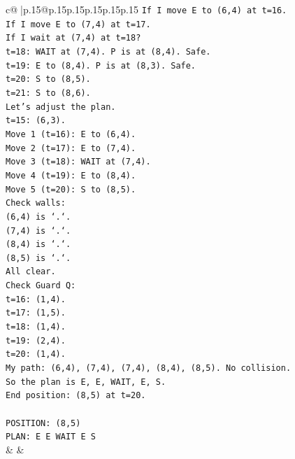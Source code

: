 \documentclass{article}
\begin{document}
{\begin{supertabular}{c@{$\;$}|p{.15\linewidth}@{}p{.15\linewidth}p{.15\linewidth}p{.15\linewidth}p{.15\linewidth}p{.15\linewidth}}
{{{\texttt{If I move E to (6,4) at t=16.} \\
\texttt{If I move E to (7,4) at t=17.} \\
\texttt{If I wait at (7,4) at t=18?} \\
\texttt{t=18: WAIT at (7,4). P is at (8,4). Safe.} \\
\texttt{t=19: E to (8,4). P is at (8,3). Safe.} \\
\texttt{t=20: S to (8,5).} \\
\texttt{t=21: S to (8,6).} \\
\texttt{Let's adjust the plan.} \\
\texttt{t=15: (6,3).} \\
\texttt{Move 1 (t=16): E to (6,4).} \\
\texttt{Move 2 (t=17): E to (7,4).} \\
\texttt{Move 3 (t=18): WAIT at (7,4).} \\
\texttt{Move 4 (t=19): E to (8,4).} \\
\texttt{Move 5 (t=20): S to (8,5).} \\
\texttt{Check walls:} \\
\texttt{(6,4) is `.`.} \\
\texttt{(7,4) is `.`.} \\
\texttt{(8,4) is `.`.} \\
\texttt{(8,5) is `.`.} \\
\texttt{All clear.} \\
\texttt{Check Guard Q:} \\
\texttt{t=16: (1,4).} \\
\texttt{t=17: (1,5).} \\
\texttt{t=18: (1,4).} \\
\texttt{t=19: (2,4).} \\
\texttt{t=20: (1,4).} \\
\texttt{My path: (6,4), (7,4), (7,4), (8,4), (8,5). No collision.} \\
\texttt{So the plan is E, E, WAIT, E, S.} \\
\texttt{End position: (8,5) at t=20.} \\
\\ 
\texttt{POSITION: (8,5)} \\
\texttt{PLAN: E E WAIT E S} \\
            }
        }
    }
    & & \\ \\


\end{supertabular}}
\end{document}
